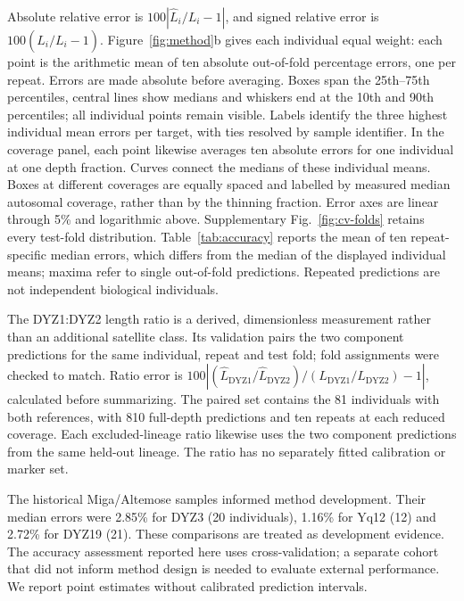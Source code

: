 \documentclass[pdflatex,sn-nature]{sn-jnl}
\begin{document}
Absolute relative error is $100|\widehat L_i/L_i-1|$, and signed relative error is $100(\widehat L_i/L_i-1)$. Figure~\ref{fig:method}b gives each individual equal weight: each point is the arithmetic mean of ten absolute out-of-fold percentage errors, one per repeat. Errors are made absolute before averaging. Boxes span the 25th--75th percentiles, central lines show medians and whiskers end at the 10th and 90th percentiles; all individual points remain visible. Labels identify the three highest individual mean errors per target, with ties resolved by sample identifier. In the coverage panel, each point likewise averages ten absolute errors for one individual at one depth fraction. Curves connect the medians of these individual means. Boxes at different coverages are equally spaced and labelled by measured median autosomal coverage, rather than by the thinning fraction. Error axes are linear through 5\% and logarithmic above. Supplementary Fig.~\ref{fig:cv-folds} retains every test-fold distribution. Table~\ref{tab:accuracy} reports the mean of ten repeat-specific median errors, which differs from the median of the displayed individual means; maxima refer to single out-of-fold predictions. Repeated predictions are not independent biological individuals.

The DYZ1:DYZ2 length ratio is a derived, dimensionless measurement rather than an additional satellite class. Its validation pairs the two component predictions for the same individual, repeat and test fold; fold assignments were checked to match. Ratio error is $100| (\widehat L_{\mathrm{DYZ1}}/\widehat L_{\mathrm{DYZ2}})/(L_{\mathrm{DYZ1}}/L_{\mathrm{DYZ2}})-1|$, calculated before summarizing. The paired set contains the 81 individuals with both references, with 810 full-depth predictions and ten repeats at each reduced coverage. Each excluded-lineage ratio likewise uses the two component predictions from the same held-out lineage. The ratio has no separately fitted calibration or marker set.

The historical Miga/Altemose samples \cite{Miga2014,Altemose2014} informed method development. Their median errors were 2.85\% for DYZ3 (20 individuals), 1.16\% for Yq12 (12) and 2.72\% for DYZ19 (21). These comparisons are treated as development evidence. The accuracy assessment reported here uses cross-validation; a separate cohort that did not inform method design is needed to evaluate external performance. We report point estimates without calibrated prediction intervals.
\end{document}
